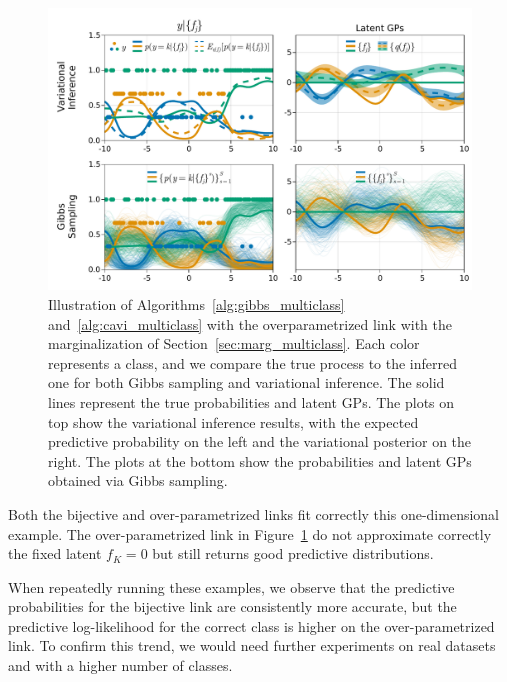 \begin{figure}[H]
    \centering
    \includegraphics[width=\textwidth]{./chapters/8_discussions/figures/categorical_nonbijective.pdf}
    \caption{Illustration of Algorithms~\ref{alg:gibbs_multiclass} and~\ref{alg:cavi_multiclass} with the overparametrized link with the marginalization of Section~\ref{sec:marg_multiclass}.
    Each color represents a class, and we compare the true process to the inferred one for both Gibbs sampling and variational inference.
    The solid lines represent the true probabilities and latent \acp{GP}.
    The plots on top show the variational inference results, with the expected predictive probability on the left and the variational posterior on the right.
    The plots at the bottom show the probabilities and latent \acp{GP} obtained via Gibbs sampling.}
    \label{fig:multiclass}
\end{figure}

Both the bijective and over-parametrized links fit correctly this one-dimensional example.
The over-parametrized link in Figure~\ref{fig:multiclass} do not approximate correctly the fixed latent $f_K=0$ but still returns good predictive distributions.

When repeatedly running these examples, we observe that the predictive probabilities for the bijective link are consistently more accurate, but the predictive log-likelihood for the correct class is higher on the over-parametrized link.
To confirm this trend, we would need further experiments on real datasets and with a higher number of classes. 


